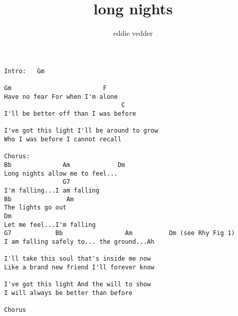 \author{eddie vedder}
\title{long nights}
\maketitle
\begin{verbatim}
Intro:   Gm

Gm                         F
Have no fear For when I'm alone
                                C
I'll be better off than I was before

I've got this light I'll be around to grow
Who I was before I cannot recall

Chorus:
Bb              Am             Dm
Long nights allow me to feel...
                G7
I'm falling...I am falling
Bb               Am
The lights go out
Dm
Let me feel...I'm falling
G7            Bb                 Am          Dm (see Rhy Fig 1)
I am falling safely to... the ground...Ah

I'll take this soul that's inside me now
Like a brand new friend I'll forever know

I've got this light And the will to show
I will always be better than before

Chorus
\end{verbatim}